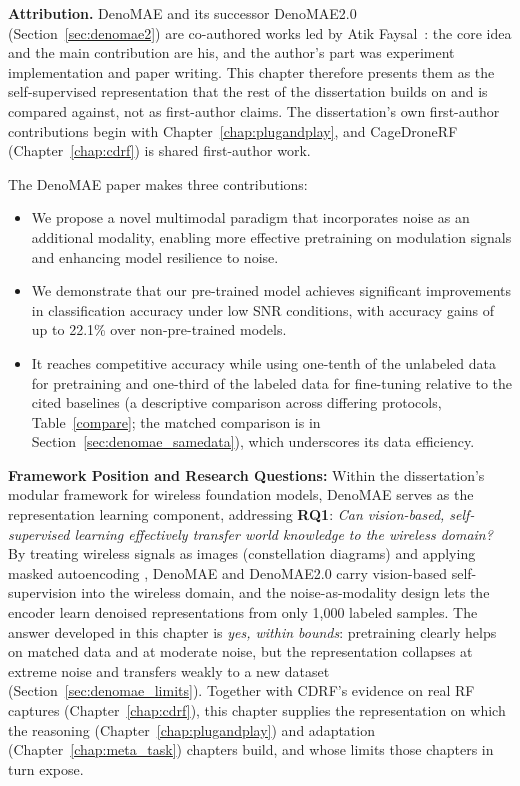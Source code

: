 \textbf{Attribution.} DenoMAE and its successor DenoMAE2.0 (Section~\ref{sec:denomae2}) are co-authored works led by Atik Faysal~\cite{faysal2025denomae,faysal2025denomae20improvingdenoisingmasked}: the core idea and the main contribution are his, and the author's part was experiment implementation and paper writing. This chapter therefore presents them as the self-supervised representation that the rest of the dissertation builds on and is compared against, not as first-author claims. The dissertation's own first-author contributions begin with Chapter~\ref{chap:plugandplay}, and CageDroneRF (Chapter~\ref{chap:cdrf}) is shared first-author work.

The DenoMAE paper makes three contributions:

\begin{itemize} 
\item We propose a novel multimodal paradigm that incorporates noise as an additional modality, enabling more effective pretraining on modulation signals and enhancing model resilience to noise. 
\item We demonstrate that our pre-trained model achieves significant improvements in classification accuracy under low SNR conditions, with accuracy gains of up to 22.1\% over non-pre-trained models. 
\item It reaches competitive accuracy while using one-tenth of the unlabeled data for pretraining and one-third of the labeled data for fine-tuning relative to the cited baselines (a descriptive comparison across differing protocols, Table~\ref{compare}; the matched comparison is in Section~\ref{sec:denomae_samedata}), which underscores its data efficiency. 
\end{itemize}

\textbf{Framework Position and Research Questions:} Within the dissertation's modular framework for wireless foundation models, DenoMAE serves as the representation learning component, addressing \textbf{RQ1}: \textit{Can vision-based, self-supervised learning effectively transfer world knowledge to the wireless domain?} By treating wireless signals as images (constellation diagrams) and applying masked autoencoding \cite{he2021mae}, DenoMAE and DenoMAE2.0 carry vision-based self-supervision into the wireless domain, and the noise-as-modality design lets the encoder learn denoised representations from only 1,000 labeled samples. The answer developed in this chapter is \emph{yes, within bounds}: pretraining clearly helps on matched data and at moderate noise, but the representation collapses at extreme noise and transfers weakly to a new dataset (Section~\ref{sec:denomae_limits}). Together with CDRF's evidence on real RF captures (Chapter~\ref{chap:cdrf}), this chapter supplies the representation on which the reasoning (Chapter~\ref{chap:plugandplay}) and adaptation (Chapter~\ref{chap:meta_task}) chapters build, and whose limits those chapters in turn expose.


